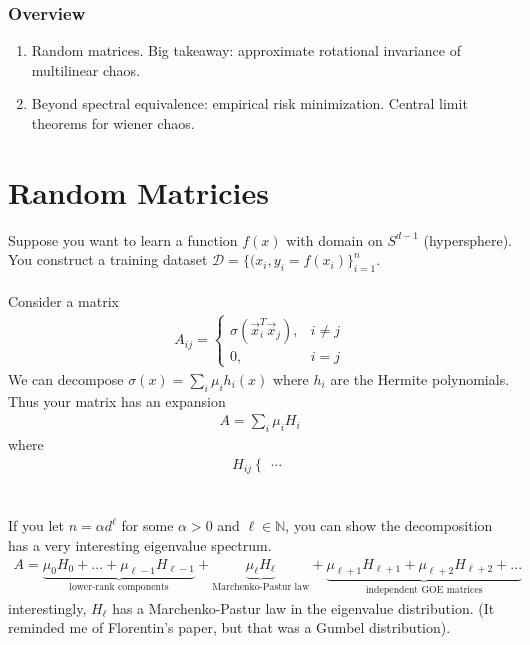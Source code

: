 \subsubsection{Overview}
\begin{enumerate}
	\item Random matrices. Big takeaway: approximate rotational invariance of multilinear chaos. 
	\item Beyond spectral equivalence: empirical risk minimization. Central limit theorems for wiener chaos.
\end{enumerate}

\section{Random Matricies}
Suppose you want to learn a function $f(x)$ with domain on $S^{d-1}$ (hypersphere). You construct a training dataset $\mathcal D=\{(x_i, y_i = f(x_i)\}_{i=1}^n$.\\
\\
Consider a matrix 
\begin{align}
	A_{ij} = \begin{cases}
		\sigma(\vec x_i^T \vec x_j), & i \neq j\\
		0, & i = j
	\end{cases}
\end{align}
We can decompose $\sigma(x) = \sum_i \mu_i h_i(x)$ where $h_i$ are the Hermite polynomials. Thus your matrix has an expansion
\begin{align}
	A = \sum_i \mu_i H_i
\end{align}
where \begin{align}
	H_{ij}\begin{cases}
		...
	\end{cases}
\end{align}
\\
\\
If you let $n = \alpha d^\ell$ for some $\alpha > 0$ and $\ell \in \mathbb N$, you can show the decomposition has a very interesting eigenvalue spectrum.
\begin{align}
	A = \underbrace{\mu_0 H_0 + ... + \mu_{\ell-1} H_{\ell-1}}_{\text{lower-rank components}} + \underbrace{\mu_\ell H_\ell}_{\text{Marchenko-Pastur law}} + \underbrace{\mu_{\ell+1} H_{\ell+1} + \mu_{\ell+2}  H_{\ell+2} + ...}_{\text{independent GOE matrices}}
\end{align}
interestingly, $H_{\ell}$ has a Marchenko-Pastur law in the eigenvalue distribution. (It reminded me of Florentin's paper, but that was a Gumbel distribution).

